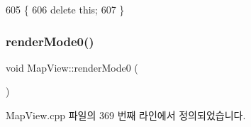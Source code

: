\begin{DoxyCode}
605 \{
606   \textcolor{keyword}{delete} \textcolor{keyword}{this};
607 \}
\end{DoxyCode}
\mbox{\label{class_map_view_a03250392fe23753257ed120df86aaea1}} 
\subsubsection{\texorpdfstring{render\+Mode0()}{renderMode0()}}
{\footnotesize\ttfamily void Map\+View\+::render\+Mode0 (\begin{DoxyParamCaption}{ }\end{DoxyParamCaption})}



Map\+View.\+cpp 파일의 369 번째 라인에서 정의되었습니다.


